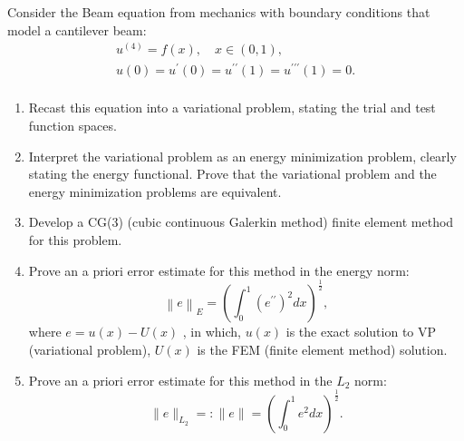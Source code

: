 \begin{exercise}
\label{applied:2021:6}
Consider the Beam equation from mechanics with boundary conditions that model a cantilever beam:
\[
\begin{array}{l} u ^ {(4)} = f (x), \quad x \in (0, 1), \\ u (0) = u ^ {\prime} (0) = u ^ {\prime \prime} (1) = u ^ {\prime \prime \prime} (1) = 0. \tag {1} \\ \end{array}
\]

\begin{enumerate}
    \item[(a)] Recast this equation into a variational problem, stating the trial and test function spaces.   
    \item[(b)] Interpret the variational problem as an energy minimization problem, clearly stating the energy functional. Prove that the variational problem and the energy minimization problems are equivalent.   
    \item[(c)] Develop a CG(3) (cubic continuous Galerkin method) finite element method for this problem.   
    \item[(d)] Prove an a priori error estimate for this method in the energy norm:
    \[
    \left\| e \right\| _ {E} = \left(\int_ {0} ^ {1} \left(e ^ {\prime \prime}\right) ^ {2} d x\right) ^ {\frac {1}{2}},
    \]
    where $e = u ( x ) - U ( x )$ , in which, $u ( x )$ is the exact solution to VP (variational problem), $U ( x )$ is the FEM (finite element method) solution.
    \item[(e)] Prove an a priori error estimate for this method in the $L _ { 2 }$ norm:
    \[
    \| e \| _ {L _ {2}} =: \| e \| = \left(\int_ {0} ^ {1} e ^ {2} d x\right) ^ {\frac {1}{2}}.
    \]
\end{enumerate}
\end{exercise}

